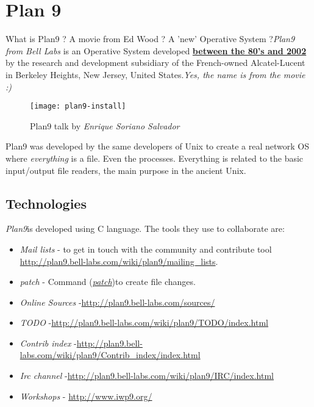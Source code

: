 \section{Plan 9}
\label{sec:plan9}

\par What is Plan9 ? A movie from Ed Wood ? A 'new' Operative System ?\textit{Plan9 from Bell Labs} is an Operative System developed  \textbf {\href{http://swtch.com/plan9history/}{between the 80's and 2002}} by the research and development subsidiary of the French-owned Alcatel-Lucent in Berkeley Heights, New Jersey, United States.\textit{Yes, the name is from the movie :)}

\begin{figure}[H]
\centering
\texttt{[image: plan9-install]}
\caption{Plan9 talk by \textit{Enrique Soriano Salvador}}
\label{plan9-film}
\end{figure}

\par Plan9 was developed by the same developers of Unix to create a real network OS where \textit{everything} is a file. Even the processes. Everything is related to the basic input/output file readers, the main purpose in the ancient Unix.

\subsection{Technologies}

\textit{Plan9}is developed using C language. The tools they use to collaborate are:
\begin{itemize}
	\item \textit{Mail lists} - to get in touch with the community and contribute tool \url{http://plan9.bell-labs.com/wiki/plan9/mailing_lists}.
	\item \textit{patch} - Command (\href{http://plan9.bell-labs.com/magic/man2html/1/patch}{\textit{patch}})to create file changes.
	\item \textit{Online Sources} -\url{http://plan9.bell-labs.com/sources/}
	\item \textit{TODO} -\url{http://plan9.bell-labs.com/wiki/plan9/TODO/index.html}
	\item \textit{Contrib index} -\url{http://plan9.bell-labs.com/wiki/plan9/Contrib_index/index.html}
	\item \textit{Irc channel} -\url{http://plan9.bell-labs.com/wiki/plan9/IRC/index.html}
	\item \textit{Workshops} - \url{http://www.iwp9.org/}
\end{itemize}

